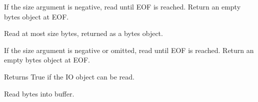 \documentclass[letterpaper,10pt,english]{sphinxmanual}
\begin{document}
\begin{fulllineitems}
\begin{fulllineitems}
\sphinxAtStartPar
If the size argument is negative, read until EOF is reached.
Return an empty bytes object at EOF.

\end{fulllineitems}


\begin{fulllineitems}
\label{\detokenize{modules/src.pig_sorting_streamlit.app:src.pig_sorting_streamlit.app.BytesIO.read1}}
\pysigstartsignatures
\pysiglinewithargsret
{}
{\sphinxparamcomma {}}
{}
\pysigstopsignatures
\sphinxAtStartPar
Read at most size bytes, returned as a bytes object.

\sphinxAtStartPar
If the size argument is negative or omitted, read until EOF is reached.
Return an empty bytes object at EOF.

\end{fulllineitems}


\begin{fulllineitems}
\label{\detokenize{modules/src.pig_sorting_streamlit.app:src.pig_sorting_streamlit.app.BytesIO.readable}}
\pysigstartsignatures
\pysiglinewithargsret
{}
{}
{}
\pysigstopsignatures
\sphinxAtStartPar
Returns True if the IO object can be read.

\end{fulllineitems}


\begin{fulllineitems}
\label{\detokenize{modules/src.pig_sorting_streamlit.app:src.pig_sorting_streamlit.app.BytesIO.readinto}}
\pysigstartsignatures
\pysiglinewithargsret
{}
{\sphinxparamcomma {}}
{}
\pysigstopsignatures
\sphinxAtStartPar
Read bytes into buffer.


\end{fulllineitems}
\end{fulllineitems}
\end{document}
